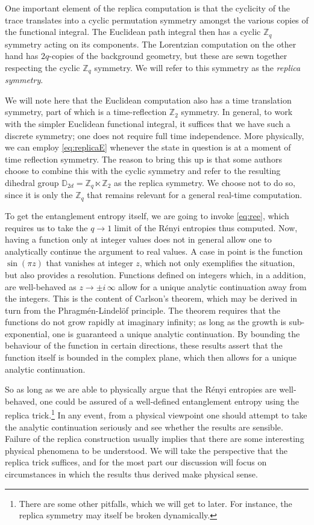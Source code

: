 \documentclass[12pt,openany]{book}
\begin{document}
One important element of the replica computation is that the cyclicity of the trace translates into a cyclic permutation symmetry amongst the various copies of the functional integral. The Euclidean path integral then has a cyclic ${\mathbb Z}_q$ symmetry acting on its components. The Lorentzian computation on the other hand has $2q$-copies of the background geometry, but these  are sewn together respecting the cyclic ${\mathbb Z}_q$ symmetry. We will refer to this symmetry as the \emph{replica symmetry}.

We will note here that the Euclidean computation also has a time translation symmetry, part of which is a time-reflection ${\mathbb Z}_2$ symmetry. In general, to work with the simpler Euclidean functional integral, it suffices that we have such a discrete symmetry; one does not require full time independence. More physically, we can employ \eqref{eq:replicaE} whenever the state in question is at a moment of time reflection symmetry. The reason to bring this up is that some authors choose to combine this with the cyclic symmetry and refer to the resulting dihedral group $\mathbb{D}_{2d} = \mathbb{Z}_q\ltimes \mathbb{Z}_2$ as the replica symmetry. We choose not to do so, since it is only the ${\mathbb Z}_q$ that remains relevant for a general real-time computation.


To get the entanglement entropy itself, we are going to invoke \eqref{eq:ree}, which requires us to take the $q\to1$ limit of the R\'enyi entropies thus computed.  Now, having a function only at integer values does not in general allow one to analytically continue the argument to real values.  A case in point is the function $\sin(\pi z)$ that  vanishes at integer $z$, which not only exemplifies the  situation, but also provides a resolution. Functions defined on integers which,  in a addition, are well-behaved as $z \to \pm i\, \infty$ allow for a unique analytic continuation away from the integers. This is the content of Carlson's theorem, which may be derived in turn from the Phragm\'en-Lindel\"of principle. The theorem requires that the functions do not grow rapidly at imaginary infinity; as long as the growth is sub-exponential, one is guaranteed a unique analytic continuation. By bounding the behaviour of the function in certain directions, these results assert that the function itself is bounded in the complex plane, which then allows for a unique analytic continuation.

So as long as we are able to physically argue that the R\'enyi  entropies are well-behaved, one could be assured of a well-defined entanglement entropy using the replica trick.\footnote{ There are some other pitfalls, which we will get to later. For instance, the replica symmetry may itself be broken dynamically.}
In any event, from a physical viewpoint one should attempt to take the analytic continuation seriously and see whether the results are sensible. Failure of the replica construction usually implies that there are some interesting physical phenomena to be understood. We will take the perspective that the replica trick suffices, and for the most part our discussion will focus on circumstances in which  the results thus derived make physical sense.
\end{document}
